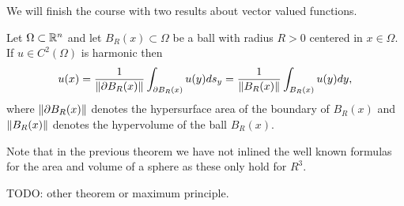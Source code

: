 We will finish the course with two results about vector valued functions.

\begin{thm}
  Let $\Omega \subset \mathbb{R}^n$ and let $B_R(x) \subset \Omega$ be a ball with
  radius $R > 0$ centered in $x \in \Omega$. If $u \in C^2(\Omega)$ is harmonic
  then
  \[
    u(x)
    = \frac{1}{\left\Vert{\partial B_R(x)}\right\Vert} \int_{\partial B_R(x)} u(y) d s_y
    = \frac{1}{\left\Vert{B_R(x)}\right\Vert} \int_{B_R(x)} u(y) dy,
  \]
  where $\left\Vert{\partial B_R(x)}\right\Vert$ denotes the hypersurface area of the boundary
  of $B_R(x)$ and $\left\Vert{B_R(x)}\right\Vert$ denotes the hypervolume of the ball $B_R(x)$.
\end{thm}

Note that in the previous theorem we have not inlined the well known formulas
for the area and volume of a sphere as these only hold for $R^3$.


TODO: other theorem or maximum principle.




